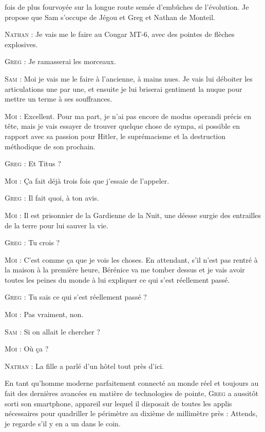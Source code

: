 \begin{dialogue}
fois de plus fourvoyée sur la longue route semée d’embûches de l’évolution. Je propose que Sam s’occupe de Jégou et Greg et Nathan de Monteil.

\illusloflabel{}%

\textsc{Nathan} : Je vais me le faire au Cougar MT-6, avec des pointes de flèches explosives.

\textsc{Greg} : Je ramasserai les morceaux.

\textsc{Sam} : Moi je vais me le faire à l’ancienne, à mains nues. Je vais lui déboiter les articulations une par une, et ensuite je lui briserai gentiment la nuque pour mettre un terme à ses souffrances.

\textsc{Moi} : Excellent. Pour ma part, je n’ai pas encore de modus operandi précis en tête, mais je vais essayer de trouver quelque chose de sympa, si possible en rapport avec sa passion pour Hitler, le suprémacisme et la destruction méthodique de son prochain.

\textsc{Greg} : Et Titus ?

\textsc{Moi} : Ça fait déjà trois fois que j’essaie de l’appeler.

\textsc{Greg} : Il fait quoi, à ton avis.

\textsc{Moi} : Il est prisonnier de la Gardienne de la Nuit, une déesse surgie des entrailles de la terre pour lui sauver la vie.

\textsc{Greg} : Tu crois ?

\textsc{Moi} : C’est comme ça que je vois les choses. En attendant, s’il n’est pas rentré à la maison à la première heure, Bérénice va me tomber dessus et je vais avoir toutes les peines du monde à lui expliquer ce qui s’est réellement passé.

\textsc{Greg} : Tu sais ce qui s’est réellement passé ?

\textsc{Moi} : Pas vraiment, non.

\textsc{Sam} : Si on allait le chercher ?

\textsc{Moi} : Où ça ?

\textsc{Nathan} : La fille a parlé d’un hôtel tout près d’ici.

\illusloflabel{}%
%
%
En tant qu’homme moderne parfaitement connecté au monde réel et toujours au fait des dernières avancées en matière de technologies de pointe, \textsc{Greg} a aussitôt sorti son smartphone, appareil sur lequel il disposait de toutes les applis nécessaires pour quadriller le périmètre au dixième de millimètre près : Attends, je regarde s’il y en a un dans le coin.


\end{dialogue}
